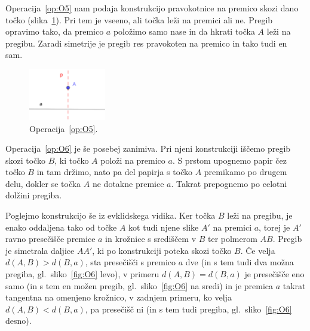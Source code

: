 Operacija~\ref{op:O5} nam podaja konstrukcijo pravokotnice na premico skozi dano točko (slika~\ref{fig:O5}). Pri tem je vseeno, ali točka leži na premici ali ne. Pregib opravimo tako, da premico $a$ položimo samo nase in da hkrati točka $A$ leži na pregibu. Zaradi simetrije je pregib res pravokoten na premico in tako tudi en sam.

\begin{figure}[h]
    \centering
    \includegraphics[width=0.3\textwidth]{images/origami_operacije/O5.png}
    \caption[Operacija~\ref{op:O5}]{Operacija~\ref{op:O5}.}
    \label{fig:O5}
\end{figure}

Operacija~\ref{op:O6} je še posebej zanimiva. Pri njeni konstrukciji iščemo pregib skozi točko $B$, ki točko $A$ položi na premico $a$. S prstom upognemo papir čez točko $B$ in tam držimo, nato pa del papirja s točko $A$ premikamo po drugem delu, dokler se točka $A$ ne dotakne premice $a$. Takrat prepognemo po celotni dolžini pregiba.

Poglejmo konstrukcijo še iz evklidskega vidika. Ker točka $B$ leži na pregibu, je enako oddaljena tako od točke $A$ kot tudi njene slike $A'$ na premici $a$, torej je $A'$ ravno presečišče premice $a$ in krožnice s središčem v $B$ ter polmerom $AB$. Pregib je simetrala daljice $AA'$, ki po konstrukciji poteka skozi točko $B$. Če velja $ d(A,B) > d(B,a) $, sta presečišči s premico $a$ dve (in s tem tudi dva možna pregiba, gl.\ sliko~\ref{fig:O6} levo), v primeru $ d(A,B) = d(B,a) $ je presečišče eno samo (in s tem en možen pregib, gl.\ sliko~\ref{fig:O6} na sredi) in je premica $a$ takrat tangentna na omenjeno krožnico, v zadnjem primeru, ko velja $ d(A,B) < d(B,a) $, pa presečišč ni (in s tem tudi pregiba, gl.\ sliko~\ref{fig:O6} desno).

